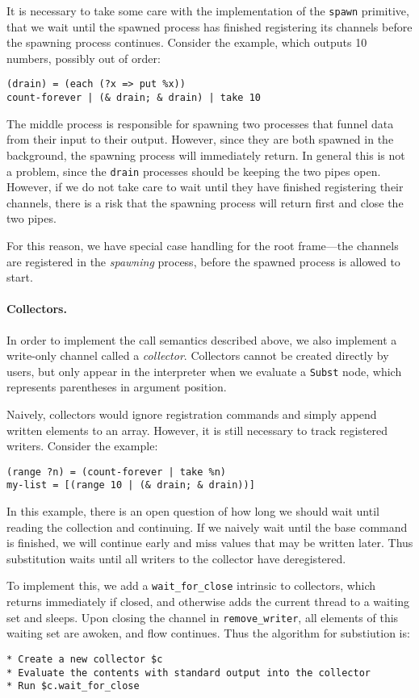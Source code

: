 \documentclass[english,preprint,JIP]{ipsj}
\begin{document}
It is necessary to take some care with the implementation of the \verb/spawn/ primitive, that we wait until the spawned process has finished registering its channels before the spawning process continues. Consider the example, which outputs 10 numbers, possibly out of order:
\begin{lstlisting}
(drain) = (each (?x => put %x))
count-forever | (& drain; & drain) | take 10
\end{lstlisting}
The middle process is responsible for spawning two processes that funnel data from their input to their output. However, since they are both spawned in the background, the spawning process will immediately return. In general this is not a problem, since the \verb/drain/ processes should be keeping the two pipes open. However, if we do not take care to wait until they have finished registering their channels, there is a risk that the spawning process will return first and close the two pipes.

For this reason, we have special case handling for the root frame---the channels are registered in the \emph{spawning} process, before the spawned process is allowed to start.

\paragraph{Collectors.}
In order to implement the call semantics described above, we also implement a write-only channel called a \emph{collector}. Collectors cannot be created directly by users, but only appear in the interpreter when we evaluate a \verb/Subst/ node, which represents parentheses in argument position.

Naively, collectors would ignore registration commands and simply append written elements to an array. However, it is still necessary to track registered writers. Consider the example:
\begin{lstlisting}
(range ?n) = (count-forever | take %n)
my-list = [(range 10 | (& drain; & drain))]
\end{lstlisting}

In this example, there is an open question of how long we should wait until reading the collection and continuing. If we naively wait until the base command is finished, we will continue early and miss values that may be written later. Thus substitution waits until all writers to the collector have deregistered.

To implement this, we add a \verb/wait_for_close/ intrinsic to collectors, which returns immediately if closed, and otherwise adds the current thread to a waiting set and sleeps. Upon closing the channel in \verb/remove_writer/, all elements of this waiting set are awoken, and flow continues. Thus the algorithm for substiution is:
\begin{lstlisting}
* Create a new collector $c
* Evaluate the contents with standard output into the collector
* Run $c.wait_for_close
\end{lstlisting}
\end{document}
